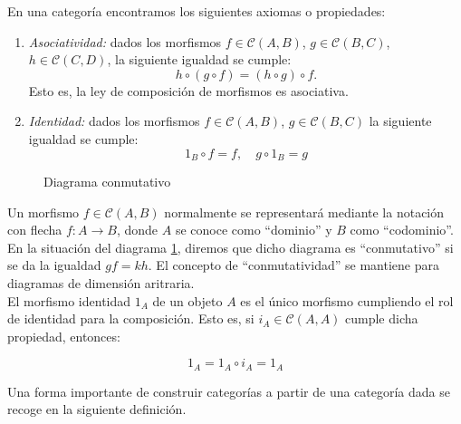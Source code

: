En una categoría encontramos los siguientes axiomas o propiedades:

\begin{enumerate}
    \item \textit{Asociatividad: } dados los morfismos $f \in \mathscr{C}(A,B)$, $g \in \mathscr{C}(B,C)$, $h \in \mathscr{C}(C,D)$, la siguiente igualdad se cumple:
        \begin{equation}
            h \circ (g \circ f) = (h \circ g) \circ f.
        \end{equation}
    Esto es, la ley de composición de morfismos es asociativa.    
    \item \textit{Identidad: } dados los morfismos $f \in \mathscr{C}(A,B)$, $g \in \mathscr{C}(B,C)$ la siguiente igualdad se cumple: 
        \begin{equation}
            1_{B} \circ f = f, \quad g \circ 1_{B} = g 
        \end{equation}
\end{enumerate}

\begin{figure}[htpb] %
    \centering
    \caption{Diagrama conmutativo}
    \label{diag:diagrama-basico}
\end{figure}

Un morfismo $f \in \mathscr{C}(A,B)$ normalmente se representará mediante la notación con flecha $f: A \longrightarrow B$, donde $A$ se conoce como ``dominio'' y $B$ como ``codominio''.
En la situación del diagrama \ref{diag:diagrama-basico}, diremos que dicho diagrama es ``conmutativo'' si se da la igualdad $gf = kh$. El concepto de ``conmutatividad'' se mantiene para diagramas de dimensión aritraria. \\
El morfismo identidad $1_{A}$ de un objeto $A$ es el único morfismo cumpliendo el rol de identidad para la composición. Esto es, si $i_{A} \in \mathscr{C}(A,A)$ cumple dicha propiedad, entonces:

\begin{equation}
    1_{A} = 1_{A} \circ i_{A} = 1_{A}
\end{equation}

Una forma importante de construir categorías a partir de una categoría dada se recoge en la siguiente definición.

